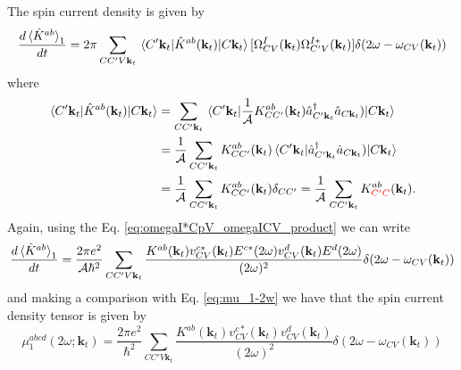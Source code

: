 \documentclass{article}
\newcommand{\kt}{\mathbf{k}_{t}}
\begin{document}
The spin current density is given by
\begin{equation}
\frac{d\ev*{\hat{K}^{ab}}_{1}}{dt} = 2 \pi \sum_{CC'V\kt} \mel{C'\kt}
{\hat{K}^{ab}(\kt)}{C\kt} [\Omega^{I}_{CV}(\kt) \Omega^{I*}_{C'V}(\kt)] \delta 
(2\omega - \omega_{CV}(\kt))
\end{equation}
where
\begin{equation*}
\begin{split}
\mel{C'\kt}{\hat{K}^{ab}(\kt)}{C\kt} &= \sum_{CC'\kt} \mel{C'\kt}
{\frac{1}{\mathcal{A}} K^{ab}_{CC'}(\kt) 
\hat{a}^{\dag}_{C'\kt} \hat{a}_{C\kt})}{C\kt}  \\
&= \frac{1}{\mathcal{A}} \sum_{CC'\kt} K^{ab}_{CC'}(\kt) \mel{C'\kt}
{\hat{a}^{\dag}_{C'\kt} \hat{a}_{C\kt})}{C\kt}  \\
&= \frac{1}{\mathcal{A}} \sum_{CC'\kt}
K^{ab}_{CC'}(\kt) \delta_{CC'} = \frac{1}{\mathcal{A}} \sum_{CC'\kt}
K^{ab}_{\color{red}{C'C}}(\kt) .
\end{split}
\end{equation*}
Again, using the Eq. \eqref{eq:omegaI*CpV_omegaICV_product} we can write
\begin{equation}
\frac{d\ev*{\hat{K}^{ab}}_{1}}{dt} = \frac{2 \pi e^{2}}{\mathcal{A} \hbar^{2}}
\sum_{CC'V\kt} \frac{K^{ab}(\kt) v^{c*}_{CV}(\kt) E^{c*}(2\omega) 
v^{d}_{CV}(\kt) E^{d}(2\omega) }{(2\omega)^{2}} \delta ({2\omega - 
\omega_{CV}(\kt)})
\end{equation}
and making a comparison with Eq. \eqref{eq:mu_1-2w} we have that the spin 
current density tensor is given by
\begin{equation}
\mu^{abcd}_{1} (2\omega;\kt) = \frac{2 \pi e^{2}}{\hbar^{2}}
\sum_{CC'V\kt} \frac{K^{ab}(\kt) v^{c*}_{CV}(\kt) v^{d}_{CV}(\kt)}
{(2\omega)^{2}} \delta ({2\omega - \omega_{CV}(\kt)})
\end{equation}
\end{document}
